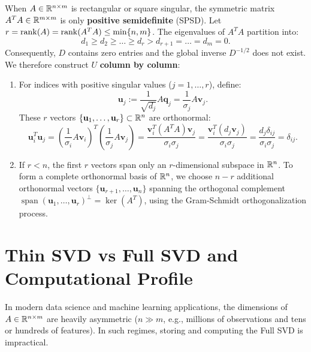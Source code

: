 When $A \in \mathbb{R}^{n \times m}$ is rectangular or square singular, the symmetric matrix $A^T A \in \mathbb{R}^{m \times m}$ is only \textbf{positive semidefinite} (SPSD).
Let $r = \operatorname{rank}(A) = \operatorname{rank}(A^T A) \le \min\{n, m\}$. The eigenvalues of $A^T A$ partition into:
\begin{equation}
    d_1 \ge d_2 \ge \dots \ge d_r > d_{r+1} = \dots = d_m = 0.
\end{equation}
Consequently, $D$ contains zero entries and the global inverse $D^{-1/2}$ does not exist. We therefore construct $U$ \textbf{column by column}:
\begin{enumerate}
    \item For indices with positive singular values ($j = 1, \dots, r$), define:
    \begin{equation}
        \mathbf{u}_j := \frac{1}{\sqrt{d_j}} A \mathbf{q}_j = \frac{1}{\sigma_j} A \mathbf{v}_j.
    \end{equation}
    These $r$ vectors $\{\mathbf{u}_1, \dots, \mathbf{u}_r\} \subset \mathbb{R}^n$ are orthonormal:
    \begin{equation}
        \mathbf{u}_i^T \mathbf{u}_j = \left(\frac{1}{\sigma_i} A \mathbf{v}_i\right)^T \left(\frac{1}{\sigma_j} A \mathbf{v}_j\right) = \frac{\mathbf{v}_i^T (A^T A) \mathbf{v}_j}{\sigma_i \sigma_j} = \frac{\mathbf{v}_i^T (d_j \mathbf{v}_j)}{\sigma_i \sigma_j} = \frac{d_j \delta_{ij}}{\sigma_i \sigma_j} = \delta_{ij}.
    \end{equation}
    \item If $r < n$, the first $r$ vectors span only an $r$-dimensional subspace in $\mathbb{R}^n$. To form a complete orthonormal basis of $\mathbb{R}^n$, we choose $n - r$ additional orthonormal vectors $\{\mathbf{u}_{r+1}, \dots, \mathbf{u}_n\}$ spanning the orthogonal complement $\operatorname{span}(\mathbf{u}_1, \dots, \mathbf{u}_r)^\perp = \ker(A^T)$, using the Gram-Schmidt orthogonalization process.
\end{enumerate}

\FloatBarrier
\section{Thin SVD vs Full SVD and Computational Profile}
\label{sec:svd-thin-vs-full-en}

In modern data science and machine learning applications, the dimensions of $A \in \mathbb{R}^{n \times m}$ are heavily asymmetric ($n \gg m$, e.g., millions of observations and tens or hundreds of features). In such regimes, storing and computing the Full SVD is impractical.

